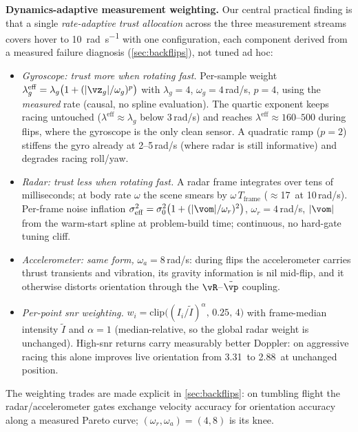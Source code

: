 \textbf{Dynamics-adaptive measurement weighting.}
Our central practical finding is that a single \emph{rate-adaptive trust
allocation} across the three measurement streams covers hover to
\SI{10}{\radian\per\second} with one configuration, each component derived
from a measured failure diagnosis (\autoref{sec:backflips}), not tuned ad hoc:
\begin{itemize}
\item \emph{Gyroscope: trust more when rotating fast.}
  Per-sample weight
  $\lambda_g^{\mathrm{eff}} = \lambda_g\bigl(1 + (|\vz_g|/\omega_g)^p\bigr)$
  with $\lambda_g{=}4$, $\omega_g{=}4$\,rad/s, $p{=}4$, using the
  \emph{measured} rate (causal, no spline evaluation).  The quartic
  exponent keeps racing untouched ($\lambda^{\mathrm{eff}}\!\approx\!\lambda_g$
  below 3\,rad/s) and reaches $\lambda^{\mathrm{eff}}\!\approx\!160$--$500$
  during flips, where the gyroscope is the only clean sensor.  A
  quadratic ramp ($p{=}2$) stiffens the gyro already at 2--5\,rad/s
  (where radar is still informative) and degrades racing roll/yaw.
\item \emph{Radar: trust less when rotating fast.}
  A radar frame integrates over tens of milliseconds; at body rate
  $\omega$ the scene smears by $\omega\,T_{\mathrm{frame}}$
  ($\approx$17\degree\ at 10\,rad/s).  Per-frame noise inflation
  $\sigma_{\mathrm{eff}}^2 = \sigma_0^2\bigl(1+(|\vom|/\omega_r)^2\bigr)$,
  $\omega_r{=}4$\,rad/s, $|\vom|$ from the warm-start spline at
  problem-build time; continuous, no hard-gate tuning cliff.
\item \emph{Accelerometer: same form,} $\omega_a{=}8$\,rad/s:
  during flips the accelerometer carries thrust transients and
  vibration, its gravity information is nil mid-flip, and it otherwise
  distorts orientation through the $\vR$--$\ddot{\vp}$ coupling.
\item \emph{Per-point \ac{snr} weighting.}
  $w_i = \mathrm{clip}\bigl((I_i/\tilde{I})^{\alpha},\,0.25,\,4\bigr)$
  with frame-median intensity $\tilde I$ and $\alpha{=}1$
  (median-relative, so the global radar weight is unchanged).  High-\ac{snr}
  returns carry measurably better Doppler: on aggressive racing this
  alone improves live orientation from 3.31\degree\ to 2.88\degree\ at
  unchanged position.
\end{itemize}
The weighting trades are made explicit in
\autoref{sec:backflips}: on tumbling flight the radar/accelerometer
gates exchange velocity accuracy for orientation accuracy along a
measured Pareto curve; $(\omega_r,\omega_a){=}(4,8)$ is its knee.

